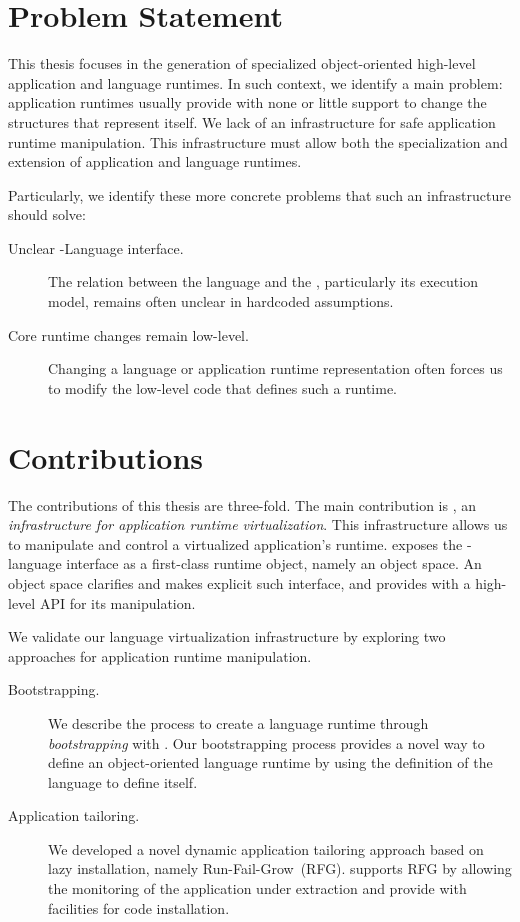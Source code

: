 \section{Problem Statement}

This thesis focuses in the generation of specialized object-oriented high-level application and language runtimes. In such context, we identify a main problem: application runtimes usually provide with none or little support to change the structures that represent itself. We lack of an infrastructure for safe application runtime manipulation. This infrastructure must allow both the specialization and extension of application and language runtimes.

Particularly, we identify these more concrete problems that such an infrastructure should solve:
\begin{description}
\item[Unclear \VM-Language interface.] The relation between the language and the \VM, particularly its execution model, remains often unclear in \VM hardcoded assumptions.
\item[Core runtime changes remain low-level.] Changing a language or application runtime representation often forces us to modify the low-level code that defines such a runtime.
\end{description}


\section{Contributions}

The contributions of this thesis are three-fold. The main contribution is \Vtt, an \emph{infrastructure for application runtime virtualization}. This infrastructure allows us to manipulate and control a virtualized application's runtime. \Vtt exposes the \VM-language interface as a first-class runtime object, namely an object space. An object space clarifies and makes explicit such interface, and provides with a high-level API for its manipulation.

We validate our language virtualization infrastructure by exploring two approaches for application runtime manipulation.
\begin{description}
\item[Bootstrapping.] We describe the process to create a language runtime through \emph{bootstrapping} with \Vtt. Our bootstrapping process provides a novel way to define an object-oriented language runtime by using the definition of the language to define itself.
\item[Application tailoring.] We developed a novel dynamic application tailoring approach based on lazy installation, namely Run-Fail-Grow~(RFG). \Vtt supports RFG by allowing the monitoring of the application under extraction and provide with facilities for code installation.
\end{description}

